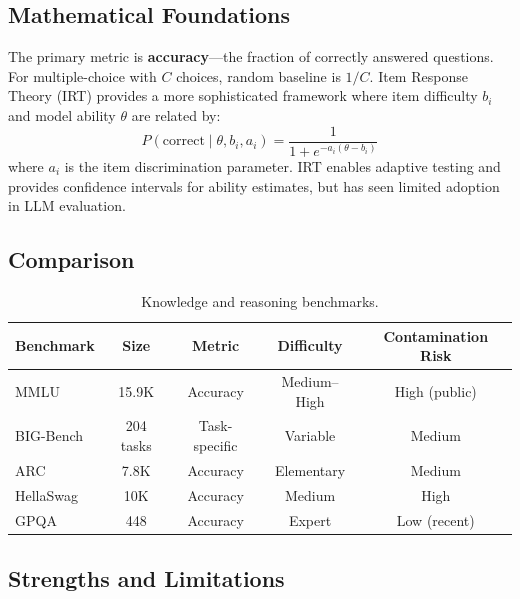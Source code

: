 \documentclass[11pt]{article}
\begin{document}
\subsection{Mathematical Foundations}

The primary metric is \textbf{accuracy}---the fraction of correctly answered questions. For multiple-choice with $C$ choices, random baseline is $1/C$. Item Response Theory (IRT) provides a more sophisticated framework where item difficulty $b_i$ and model ability $\theta$ are related by:
\begin{equation}
P(\text{correct} \mid \theta, b_i, a_i) = \frac{1}{1 + e^{-a_i(\theta - b_i)}}
\end{equation}
where $a_i$ is the item discrimination parameter. IRT enables adaptive testing and provides confidence intervals for ability estimates, but has seen limited adoption in LLM evaluation.

\subsection{Comparison}

\begin{table}[h]
\centering
\caption{Knowledge and reasoning benchmarks.}
\small
\begin{tabular}{@{}lcccc@{}}
\toprule
\textbf{Benchmark} & \textbf{Size} & \textbf{Metric} & \textbf{Difficulty} & \textbf{Contamination Risk} \\
\midrule
MMLU & 15.9K & Accuracy & Medium--High & High (public) \\
BIG-Bench & 204 tasks & Task-specific & Variable & Medium \\
ARC & 7.8K & Accuracy & Elementary & Medium \\
HellaSwag & 10K & Accuracy & Medium & High \\
GPQA & 448 & Accuracy & Expert & Low (recent) \\
\bottomrule
\end{tabular}
\end{table}

\subsection{Strengths and Limitations}
\end{document}
